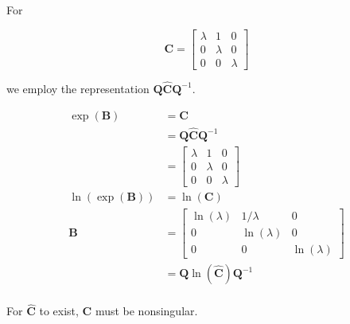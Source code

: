 For

\begin{equation*}
 \mathbf{C} = \begin{bmatrix}
      \lambda & 1 & 0\\
      0 & \lambda & 0\\
      0 & 0 & \lambda
     \end{bmatrix}
\end{equation*}

we employ the representation $\mathbf{Q} \hat{\mathbf{C}} \mathbf{Q}^{-1}$.

\begin{align*}
 \exp(\mathbf{B})   &= \mathbf{C}\\
                    &= \mathbf{Q} \hat{\mathbf{C}} \mathbf{Q}^{-1}\\
                    &= \begin{bmatrix}
                        \lambda & 1 & 0\\
                        0 & \lambda & 0\\
                        0 & 0 & \lambda
                       \end{bmatrix}\\
\ln(\exp(\mathbf{B})) &= \ln(\mathbf{C})\\
\mathbf{B} &= \begin{bmatrix}
                \ln(\lambda) & 1/\lambda & 0\\
                0 & \ln(\lambda ) & 0\\
                0 & 0 & \ln(\lambda)
                \end{bmatrix}\\
            &= \mathbf{Q} \ln(\hat{\mathbf{C}}) \mathbf{Q}^{-1}\\
\end{align*}

For $\hat{\mathbf{C}}$ to exist, $\mathbf{C}$ must be nonsingular.
